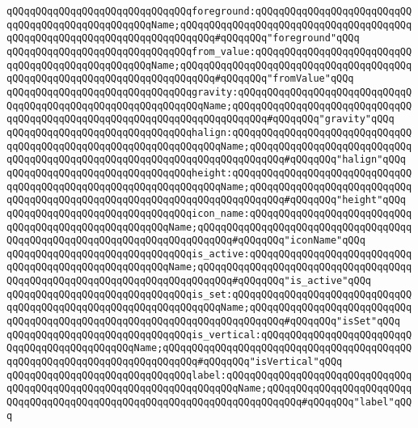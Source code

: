 \newline
\verb|qQQqqQQqqQQqqQQqqQQqqQQqqQQqqQQqforeground:qQQqqQQqqQQqqQQqqQQqqQQqqQQqqQQqqQQqqQQqqQQqqQQqqQQqName;qQQqqQQqqQQqqQQqqQQqqQQqqQQqqQQqqQQqqQQqqQQqqQQqqQQqqQQqqQQqqQQqqQQqqQQqqQQq#qQQqqQQq"foreground"qQQq|\newline
\verb|qQQqqQQqqQQqqQQqqQQqqQQqqQQqqQQqfrom_value:qQQqqQQqqQQqqQQqqQQqqQQqqQQqqQQqqQQqqQQqqQQqqQQqqQQqName;qQQqqQQqqQQqqQQqqQQqqQQqqQQqqQQqqQQqqQQqqQQqqQQqqQQqqQQqqQQqqQQqqQQqqQQqqQQq#qQQqqQQq"fromValue"qQQq|\newline
\verb|qQQqqQQqqQQqqQQqqQQqqQQqqQQqqQQqgravity:qQQqqQQqqQQqqQQqqQQqqQQqqQQqqQQqqQQqqQQqqQQqqQQqqQQqqQQqqQQqqQQqName;qQQqqQQqqQQqqQQqqQQqqQQqqQQqqQQqqQQqqQQqqQQqqQQqqQQqqQQqqQQqqQQqqQQqqQQqqQQq#qQQqqQQq"gravity"qQQq|\newline
\newline
\verb|qQQqqQQqqQQqqQQqqQQqqQQqqQQqqQQqhalign:qQQqqQQqqQQqqQQqqQQqqQQqqQQqqQQqqQQqqQQqqQQqqQQqqQQqqQQqqQQqqQQqqQQqName;qQQqqQQqqQQqqQQqqQQqqQQqqQQqqQQqqQQqqQQqqQQqqQQqqQQqqQQqqQQqqQQqqQQqqQQqqQQq#qQQqqQQq"halign"qQQq|\newline
\verb|qQQqqQQqqQQqqQQqqQQqqQQqqQQqqQQqheight:qQQqqQQqqQQqqQQqqQQqqQQqqQQqqQQqqQQqqQQqqQQqqQQqqQQqqQQqqQQqqQQqqQQqName;qQQqqQQqqQQqqQQqqQQqqQQqqQQqqQQqqQQqqQQqqQQqqQQqqQQqqQQqqQQqqQQqqQQqqQQqqQQq#qQQqqQQq"height"qQQq|\newline
\newline
\verb|qQQqqQQqqQQqqQQqqQQqqQQqqQQqqQQqicon_name:qQQqqQQqqQQqqQQqqQQqqQQqqQQqqQQqqQQqqQQqqQQqqQQqqQQqqQQqName;qQQqqQQqqQQqqQQqqQQqqQQqqQQqqQQqqQQqqQQqqQQqqQQqqQQqqQQqqQQqqQQqqQQqqQQqqQQq#qQQqqQQq"iconName"qQQq|\newline
\verb|qQQqqQQqqQQqqQQqqQQqqQQqqQQqqQQqis_active:qQQqqQQqqQQqqQQqqQQqqQQqqQQqqQQqqQQqqQQqqQQqqQQqqQQqqQQqName;qQQqqQQqqQQqqQQqqQQqqQQqqQQqqQQqqQQqqQQqqQQqqQQqqQQqqQQqqQQqqQQqqQQqqQQqqQQq#qQQqqQQq"is_active"qQQq|\newline
\verb|qQQqqQQqqQQqqQQqqQQqqQQqqQQqqQQqis_set:qQQqqQQqqQQqqQQqqQQqqQQqqQQqqQQqqQQqqQQqqQQqqQQqqQQqqQQqqQQqqQQqqQQqName;qQQqqQQqqQQqqQQqqQQqqQQqqQQqqQQqqQQqqQQqqQQqqQQqqQQqqQQqqQQqqQQqqQQqqQQqqQQq#qQQqqQQq"isSet"qQQq|\newline
\verb|qQQqqQQqqQQqqQQqqQQqqQQqqQQqqQQqis_vertical:qQQqqQQqqQQqqQQqqQQqqQQqqQQqqQQqqQQqqQQqqQQqqQQqName;qQQqqQQqqQQqqQQqqQQqqQQqqQQqqQQqqQQqqQQqqQQqqQQqqQQqqQQqqQQqqQQqqQQqqQQqqQQq#qQQqqQQq"isVertical"qQQq|\newline
\newline
\verb|qQQqqQQqqQQqqQQqqQQqqQQqqQQqqQQqlabel:qQQqqQQqqQQqqQQqqQQqqQQqqQQqqQQqqQQqqQQqqQQqqQQqqQQqqQQqqQQqqQQqqQQqqQQqName;qQQqqQQqqQQqqQQqqQQqqQQqqQQqqQQqqQQqqQQqqQQqqQQqqQQqqQQqqQQqqQQqqQQqqQQqqQQq#qQQqqQQq"label"qQQq|\newline
